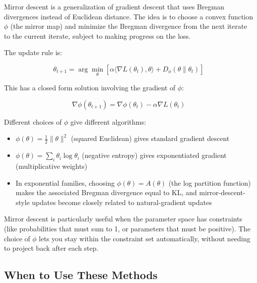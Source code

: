 Mirror descent is a generalization of gradient descent that uses Bregman divergences instead of Euclidean distance. The idea is to choose a convex function $\phi$ (the mirror map) and minimize the Bregman divergence from the next iterate to the current iterate, subject to making progress on the loss.

The update rule is:

\begin{equation}
\theta_{t+1} = \arg\min_\theta \left[\alpha \langle \nabla L(\theta_t), \theta \rangle + D_\phi(\theta \| \theta_t)\right]
\end{equation}

This has a closed form solution involving the gradient of $\phi$:

\begin{equation}
\nabla \phi(\theta_{t+1}) = \nabla \phi(\theta_t) - \alpha \nabla L(\theta_t)
\end{equation}

\vspace{1em}

Different choices of $\phi$ give different algorithms:

\begin{itemize}
\item $\phi(\theta) = \frac{1}{2}\|\theta\|^2$ (squared Euclidean) gives standard gradient descent

\item $\phi(\theta) = \sum_i \theta_i \log \theta_i$ (negative entropy) gives exponentiated gradient (multiplicative weights)

\item In exponential families, choosing $\phi(\theta)=A(\theta)$ (the log partition function) makes the associated Bregman divergence equal to KL, and mirror-descent-style updates become closely related to natural-gradient updates
\end{itemize}

\vspace{1em}

Mirror descent is particularly useful when the parameter space has constraints (like probabilities that must sum to 1, or parameters that must be positive). The choice of $\phi$ lets you stay within the constraint set automatically, without needing to project back after each step.

\vspace{1.5em}

\subsection{When to Use These Methods}

